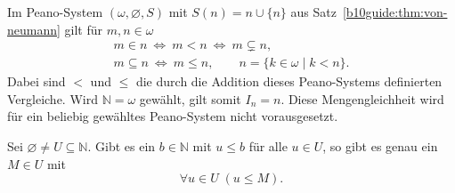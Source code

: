 \begin{theorem}
\label{b10guide:thm:von-neumann-order}
Im Peano-System $(\omega,\varnothing,S)$ mit $S(n)=n\cup\{n\}$
aus Satz~\ref{b10guide:thm:von-neumann} gilt für $m,n\in\omega$
\[
 \begin{gathered}
 m\in n\ \Longleftrightarrow\ m<n\ \Longleftrightarrow\ m\subsetneq n,\\
 m\subseteq n\ \Longleftrightarrow\ m\le n,\qquad
 n=\{k\in\omega\mid k<n\}.
 \end{gathered}
\]
Dabei sind $<$ und $\le$ die durch die Addition dieses Peano-Systems
definierten Vergleiche. Wird $\mathbb N=\omega$ gewählt, gilt somit
$I_n=n$. Diese Mengengleichheit wird für ein beliebig gewähltes
Peano-System nicht vorausgesetzt.
\end{theorem}

\begin{theorem}
\label{b10guide:thm:bounded-maximum}
Sei $\varnothing\ne U\subseteq\mathbb N$. Gibt es ein $b\in\mathbb N$
mit $u\le b$ für alle $u\in U$, so gibt es genau ein $M\in U$ mit
\[
 \forall u\in U\;(u\le M).
\]
\end{theorem}
